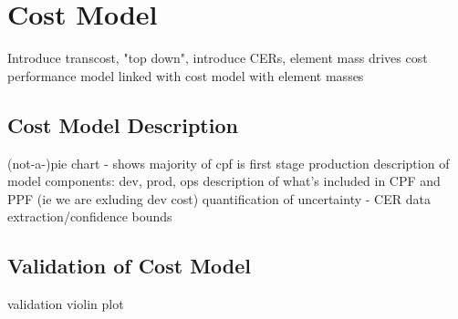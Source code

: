\documentclass[conf]{new-aiaa}
\begin{document}
\section{Cost Model}
Introduce transcost, "top down", introduce CERs, element mass drives cost
performance model linked with cost model with element masses

\subsection{Cost Model Description}
(not-a-)pie chart - shows majority of cpf is first stage production
description of model components: dev, prod, ops
description of what's included in CPF and PPF (ie we are exluding dev cost)
quantification of uncertainty - CER data extraction/confidence bounds

\subsection{Validation of Cost Model}
validation violin plot


\end{document}
